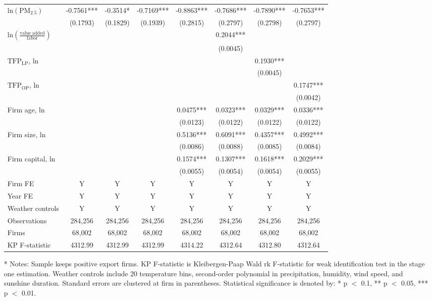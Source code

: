 \documentclass[12pt]{article}
\begin{document}
\begin{table}[H]
{\begin{tabular}{l*{7}{c}}
$\mathrm{ln(PM_{2.5})}$                    
                        &-0.7561***&-0.3514*&-0.7169***&-0.8863***&-0.7686***&-0.7890***&-0.7653*** \\
                        &(0.1793)  &(0.1829)&(0.1939)  &(0.2815)  &(0.2797)  &(0.2798)  &(0.2797) \\
$\mathrm{ln(\frac{value\ added}{labor})}$ &      &        &          &          &0.2044***&&\\
                        &      &        &          &         &(0.0045)  &          &\\
$\mathrm{TFP_{LP}}$, ln          &      &        &           &          &        &0.1930*** &\\
                        &       &        &         &         &          &(0.0045)&\\
$\mathrm{TFP_{OP}}$, ln          &       &         &        &           &        & &0.1747***\\
                        &      &         &         &         &          &         &(0.0042) \\
Firm age, ln            &       &      &        &0.0475***&0.0323***&0.0329***&0.0336***\\
                        &        &         &        &(0.0123) &(0.0122)&(0.0122)&(0.0122)\\
Firm size, ln           &        &         &        &0.5136***&0.6091***&0.4357***&0.4992***\\
                        &        &         &        &(0.0086) &(0.0088)&(0.0085) &(0.0084)\\
Firm capital, ln        &        &         &        &0.1574***&0.1307***&0.1618***&0.2029***\\
                        &        &         &        &(0.0055) &(0.0054)&(0.0054) &(0.0055)\\
     \hline
    Firm FE  &Y&Y&Y&Y&Y&Y&Y\\
    Year FE  &Y&Y&Y&Y&Y&Y&Y\\
    Weather controls &Y&Y&Y&Y&Y&Y&Y\\
    \hline
    Observations    &284,256&284,256&284,256&284,256&284,256&284,256&284,256\\
    Firms           &68,002 &68,002 &68,002 &68,002 &68,002&68,002 &68,002\\
    KP F-statistic	&4312.99&4312.99&4312.99&4314.22&4312.64&4312.80&4312.64\\
    \hline\hline
    \end{tabular}}
    \begin{tablenotes}
    \item[*] \small Notes: Sample keeps positive export firms. KP F-statistic is Kleibergen-Paap Wald rk F-statistic for weak identification test in the stage one estimation. Weather controls include 20 temperature bins, second-order polynomial in precipitation, humidity, wind speed, and sunshine duration. Standard errors are clustered at firm in parentheses. Statistical significance is denoted by: * p $<$ 0.1, ** p $<$ 0.05, *** p $<$ 0.01.
    \end{tablenotes}
    \end{table}
\end{document}

